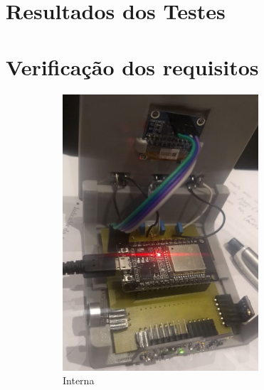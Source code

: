 \documentclass[../monografia.tex]{subfiles}
\begin{document}

\section{Resultados dos Testes}
\section{Verificação dos requisitos}




\begin{figure}[h]
	\centering
	\begin{subfigure}{0.5\textwidth}
		\centering
	\includegraphics[width=0.8\textwidth]{placa-final}
	\caption{Interna}
	\label{fig:interna}
	\end{subfigure}%
	\begin{subfigure}{0.5\textwidth}
		\centering

\end{subfigure}
\end{figure}
\end{document}
